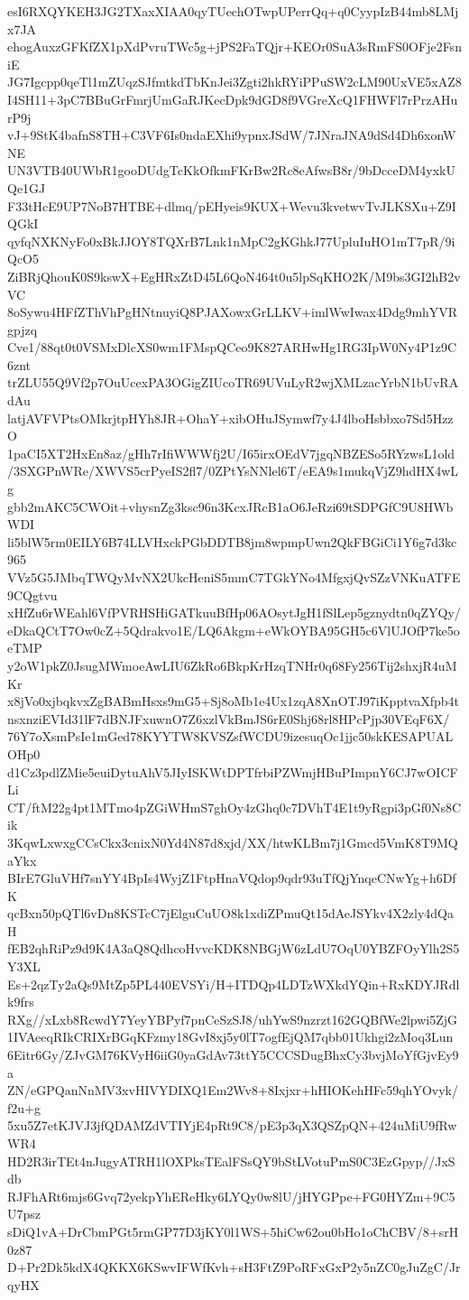 esI6RXQYKEH3JG2TXaxXIAA0qyTUechOTwpUPerrQq+q0CyypIzB44mb8LMjx7JA
ehogAuxzGFKfZX1pXdPvruTWc5g+jPS2FaTQjr+KEOr0SuA3sRmFS0OFje2FsniE
JG7Igcpp0qeTl1mZUqzSJfmtkdTbKnJei3Zgti2hkRYiPPuSW2cLM90UxVE5xAZ8
I4SH11+3pC7BBuGrFmrjUmGaRJKecDpk9dGD8f9VGreXcQ1FHWFl7rPrzAHurP9j
vJ+9StK4bafnS8TH+C3VF6Is0ndaEXhi9ypnxJSdW/7JNraJNA9dSd4Dh6xonWNE
UN3VTB40UWbR1gooDUdgTcKkOfkmFKrBw2Rc8eAfwsB8r/9bDcceDM4yxkUQe1GJ
F33tHcE9UP7NoB7HTBE+dlmq/pEHyeis9KUX+Wevu3kvetwvTvJLKSXu+Z9IQGkI
qyfqNXKNyFo0xBkJJOY8TQXrB7Lnk1nMpC2gKGhkJ77UpluIuHO1mT7pR/9iQcO5
ZiBRjQhouK0S9kswX+EgHRxZtD45L6QoN464t0u5lpSqKHO2K/M9bs3GI2hB2vVC
8oSywu4HFfZThVhPgHNtnuyiQ8PJAXowxGrLLKV+imlWwIwax4Ddg9mhYVRgpjzq
Cve1/88qt0t0VSMxDlcXS0wm1FMspQCeo9K827ARHwHg1RG3IpW0Ny4P1z9C6znt
trZLU55Q9Vf2p7OuUcexPA3OGigZIUcoTR69UVuLyR2wjXMLzacYrbN1bUvRAdAu
latjAVFVPtsOMkrjtpHYh8JR+OhaY+xibOHuJSymwf7y4J4lboHsbbxo7Sd5HzzO
1paCI5XT2HxEn8az/gHh7rIfiWWWfj2U/I65irxOEdV7jgqNBZESo5RYzwsL1old
/3SXGPnWRe/XWVS5crPyeIS2fl7/0ZPtYsNNlel6T/eEA9s1mukqVjZ9hdHX4wLg
gbb2mAKC5CWOit+vhysnZg3ksc96n3KcxJRcB1aO6JeRzi69tSDPGfC9U8HWbWDI
li5blW5rm0EILY6B74LLVHxckPGbDDTB8jm8wpmpUwn2QkFBGiCi1Y6g7d3kc965
VVz5G5JMbqTWQyMvNX2UkcHeniS5mmC7TGkYNo4MfgxjQvSZzVNKuATFE9CQgtvu
xHfZu6rWEahl6VfPVRHSHiGATkuuBfHp06AOsytJgH1fSlLep5gznydtn0qZYQy/
eDkaQCtT7Ow0cZ+5Qdrakvo1E/LQ6Akgm+eWkOYBA95GH5c6VlUJOfP7ke5oeTMP
y2oW1pkZ0JsugMWmoeAwLIU6ZkRo6BkpKrHzqTNHr0q68Fy256Tij2shxjR4uMKr
x8jVo0xjbqkvxZgBABmHsxs9mG5+Sj8oMb1e4Ux1zqA8XnOTJ97iKpptvaXfpb4t
nsxnziEVId31lF7dBNJFxuwnO7Z6xzlVkBmJS6rE0Shj68rl8HPcPjp30VEqF6X/
76Y7oXsmPsIe1mGed78KYYTW8KVSZsfWCDU9izesuqOc1jjc50skKESAPUALOHp0
d1Cz3pdlZMie5euiDytuAhV5JIyISKWtDPTfrbiPZWmjHBuPImpnY6CJ7wOICFLi
CT/ftM22g4pt1MTmo4pZGiWHmS7ghOy4zGhq0c7DVhT4E1t9yRgpi3pGf0Ns8Cik
3KqwLxwxgCCsCkx3cnixN0Yd4N87d8xjd/XX/htwKLBm7j1Gmcd5VmK8T9MQaYkx
BIrE7GluVHf7snYY4BpIs4WyjZ1FtpHnaVQdop9qdr93uTfQjYnqeCNwYg+h6DfK
qcBxn50pQTl6vDn8KSTcC7jElguCuUO8k1xdiZPmuQt15dAeJSYkv4X2zly4dQaH
fEB2qhRiPz9d9K4A3aQ8QdhcoHvvcKDK8NBGjW6zLdU7OqU0YBZFOyYlh2S5Y3XL
Es+2qzTy2aQs9MtZp5PL440EVSYi/H+ITDQp4LDTzWXkdYQin+RxKDYJRdlk9frs
RXg//xLxb8RcwdY7YeyYBPyf7pnCeSzSJ8/uhYwS9nzrzt162GQBfWe2lpwi5ZjG
1IVAeeqRIkCRIXrBGqKFzmy18GvI8xj5y0lT7ogfEjQM7qbb01Ukhgi2zMoq3Lun
6Eitr6Gy/ZJvGM76KVyH6iiG0yaGdAv73ttY5CCCSDugBhxCy3bvjMoYfGjvEy9a
ZN/eGPQanNnMV3xvHIVYDIXQ1Em2Wv8+8Ixjxr+hHIOKehHFc59qhYOvyk/f2u+g
5xu5Z7etKJVJ3jfQDAMZdVTIYjE4pRt9C8/pE3p3qX3QSZpQN+424uMiU9fRwWR4
HD2R3irTEt4nJugyATRH1lOXPksTEalFSsQY9bStLVotuPmS0C3EzGpyp//JxSdb
RJFhARt6mjs6Gvq72yekpYhEReHky6LYQy0w8lU/jHYGPpe+FG0HYZm+9C5U7psz
sDiQ1vA+DrCbmPGt5rmGP77D3jKY0l1WS+5hiCw62ou0bHo1oChCBV/8+srH0z87
D+Pr2Dk5kdX4QKKX6KSwvIFWfKvh+sH3FtZ9PoRFxGxP2y5nZC0gJuZgC/JrqyHX
